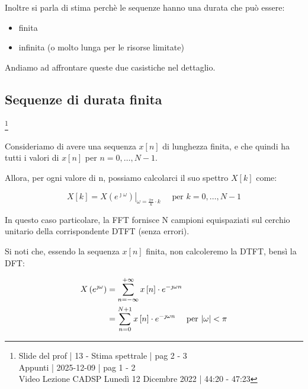 Inoltre si parla di stima perchè le sequenze hanno una durata che può essere: 

\begin{itemize}
    \item finita 
    \item infinita (o molto lunga per le risorse limitate)
\end{itemize}

Andiamo ad affrontare queste due casistiche nel dettaglio. \newline 

\newpage 

\subsection{Sequenze di durata finita}

\footnote{ 
    Slide del prof | 13 - Stima spettrale | pag 2 - 3\\
    Appunti | 2025-12-09 | pag 1 - 2  \\ 
    Video Lezione CADSP Lunedì 12 Dicembre 2022 | 44:20 - 47:23   
}

Consideriamo di avere una sequenza $x \left[ n\right]$ di lunghezza finita, e che quindi ha tutti i valori di $x \left[ n\right]$ per $n = 0, \dots, N-1$. \newline 

Allora, per ogni valore di n, possiamo calcolarci il suo spettro $X \left[ k\right]$ come: 

{
    \Large 
    \begin{equation}
        X \left[ k\right]
        = 
        \left.
            X \left(e^{\jmath \omega}\right)
        \right|_{\omega = \frac{2 \pi}{k} \cdot k}
        \quad 
        \text{ per }
        k = 0, \dots, N - 1
    \end{equation}
}

In questo caso particolare, la FFT fornisce N campioni equispaziati sul cerchio unitario della corrispondente DTFT (senza errori). \newline 

Si noti che, essendo la sequenza $x \left[ n\right]$ finita, non calcoleremo la DTFT, bensì la DFT: 

{
    \Large 
    \begin{equation}
        \begin{split}
            X \left(e^{\jmath \omega}\right) 
            &= 
            \sum_{n = - \infty}^{+ \infty} 
            x \left[ n\right]
            \cdot 
            e^{- \jmath \omega n}
            \\
            &= 
            \sum_{n = 0}^{N + 1} 
            x \left[ n\right]
            \cdot 
            e^{- \jmath \omega n} 
            \quad 
            \text{ per }
            \abs{\omega} < \pi
        \end{split}
    \end{equation}
}

